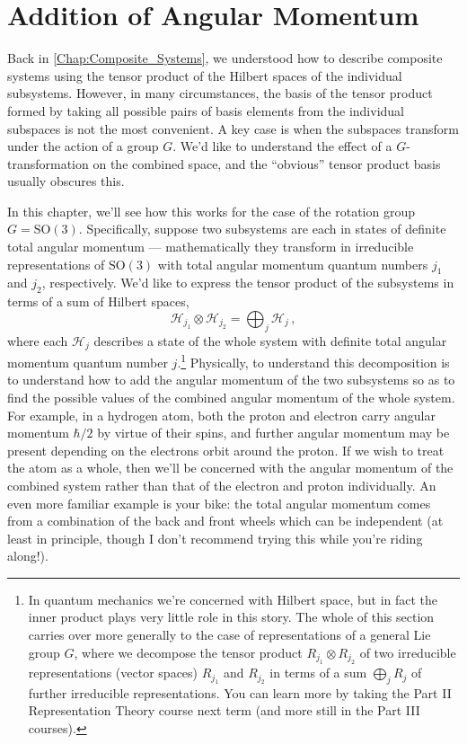 \documentclass{article}
\theoremstyle{plain}\theoremheaderfont{\normalfont\itshape}\theorembodyfont{\rmfamily}\theoremseparator{.}\newtheorem*{rem}{Remark}\newtheorem*{ex}{Example}\newtheorem*{proof}{Proof}\newtheorem*{altp}{Alternative proof}
\theoremstyle{plain}\theoremheaderfont{\normalfont\bfseries}\theorembodyfont{\rmfamily}\theoremseparator{.}\newtheorem{thm}{Theorem}[section]\newtheorem{lem}[thm]{Lemma}\newtheorem{prop}[thm]{Proposition}\newtheorem*{cor}{Corollary}\newtheorem{defn}[thm]{Definition}\newtheorem{clm}[thm]{Claim}\newtheorem{clminproof}{Claim}
\theoremstyle{break}\theoremheaderfont{\normalfont\itshape}\theorembodyfont{\rmfamily}\theoremseparator{.\medskip}\newtheorem*{proofskip}{Proof}\newtheorem*{exs}{Examples}\newtheorem*{rems}{Remarks}
\theoremstyle{break}\theoremheaderfont{\normalfont\bfseries}\theorembodyfont{\rmfamily}\theoremseparator{.\medskip}\newtheorem{lemskip}[thm]{Lemma}\newtheorem{defnskip}[thm]{Definition}\newtheorem{propskip}[thm]{Proposition}\newtheorem{thmskip}[thm]{Theorem}
\numberwithin{equation}{section}
\newcommand{\hb}{\mathcal{H}}
\newcommand{\SO}{\mathrm{SO}}
\begin{document}
    \newpage
    \section{Addition of Angular Momentum}
    Back in \cref{Chap:Composite_Systems}, we understood how to describe composite systems using the tensor product of the Hilbert spaces of the individual subsystems. However, in many circumstances, the basis of the tensor product formed by taking all possible pairs of basis elements from the individual subspaces is not the most convenient. A key case is when the subspaces transform under the action of a group \(G\). We'd like to understand the effect of a \(G\)-transformation on the combined space, and the ``obvious'' tensor product basis usually obscures this.

    In this chapter, we'll see how this works for the case of the rotation group \(G=\SO(3)\). Specifically, suppose two subsystems are each in states of definite total angular momentum --- mathematically they transform in irreducible representations of \(\SO(3)\) with total angular momentum quantum numbers \(j_1\) and \(j_2\), respectively. We'd like to express the tensor product of the subsystems in terms of a sum of Hilbert spaces,
    \begin{equation}
        \hb_{j_1}\otimes\hb_{j_2}=\bigoplus_{j}\hb_j\,,
    \end{equation}
    where each \(\hb_j\) describes a state of the whole system with definite total angular momentum quantum number \(j\).\footnote{In quantum mechanics we're concerned with Hilbert space, but in fact the inner product plays very little role in this story. The whole of this section carries over more generally to the case of representations of a general Lie group \(G\), where we decompose the tensor product \(R_{j_1}\otimes R_{j_2}\) of two irreducible representations (vector spaces) \(R_{j_1}\) and \(R_{j_2}\) in terms of a sum \(\bigoplus_j R_j\) of further irreducible representations. You can learn more by taking the Part II Representation Theory course next term (and more still in the Part III courses).} Physically, to understand this decomposition is to understand how to add the angular momentum of the two subsystems so as to find the possible values of the combined angular momentum of the whole system. For example, in a hydrogen atom, both the proton and electron carry angular momentum \(\hbar/2\) by virtue of their spins, and further angular momentum may be present depending on the electrons orbit around the proton. If we wish to treat the atom as a whole, then we'll be concerned with the angular momentum of the combined system rather than that of the electron and proton individually. An even more familiar example is your bike: the total angular momentum comes from a combination of the back and front wheels which can be independent (at least in principle, though I don't recommend trying this while you're riding along!).
\end{document}
